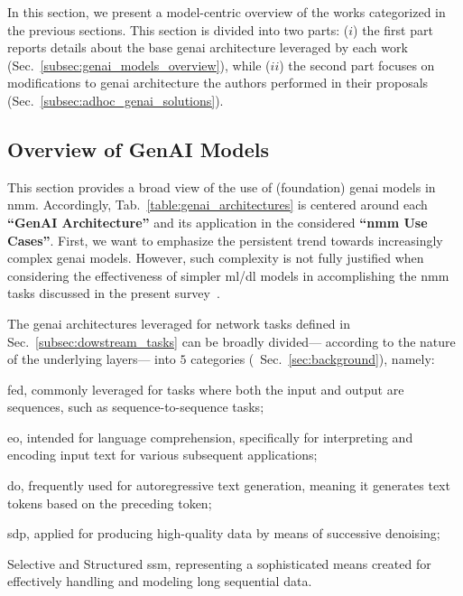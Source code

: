 

In this section, we present a model-centric overview of the works categorized in the previous sections.
This section is divided into two parts: ($i$) the first part reports details about the base \gls{genai} architecture leveraged by each work (Sec.~\ref{subsec:genai_models_overview}), while ($ii$) the second part focuses on modifications to \gls{genai} architecture the authors performed in their proposals (Sec.~\ref{subsec:adhoc_genai_solutions}).

\subsection{Overview of GenAI Models\label{subsec:genai_models_overview}
}

This section provides a broad view of the use of (foundation) \gls{genai} models in \gls{nmm}.
Accordingly, Tab.~\ref{table:genai_architectures} is centered around each \textbf{``GenAI Architecture''} and its application in the considered \textbf{``\gls{nmm} Use Cases''}.
%
First, we want to emphasize the persistent trend towards increasingly complex \gls{genai} models. 
However, such complexity is not fully justified when considering the effectiveness of simpler \gls{ml}/\gls{dl} models in accomplishing the \gls{nmm} tasks discussed in the present survey~\cite{yao2024survey}.
%


The \gls{genai} architectures leveraged for network tasks defined in Sec.~\ref{subsec:dowstream_tasks} can be broadly divided---%
according to the nature of the underlying layers---%
into $5$ categories (\cf~Sec.~\ref{sec:background}), namely:
\begin{enumerate*}[label=(\textit{\roman*})]
  \item \gls{fed},
  commonly leveraged for tasks where both the input and output are sequences, such as sequence-to-sequence tasks;
  \item \gls{eo},
  intended for language comprehension, specifically for interpreting and encoding input text for various subsequent applications;
  \item \gls{do},
  frequently used for autoregressive text generation, meaning it generates text tokens based on the preceding token;
  \item \gls{sdp},
  applied for producing high-quality data by means of successive denoising;
  \item Selective and Structured \gls{ssm},
 representing a sophisticated means created for effectively handling and modeling long sequential data.
\end{enumerate*}





